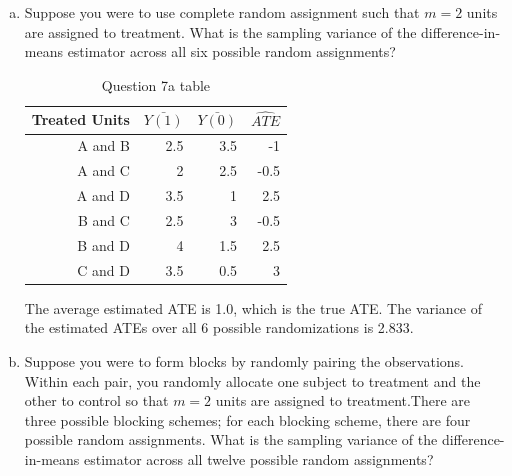 \documentclass[11pt,notitlepage]{article}\usepackage[]{graphicx}\usepackage[]{color}
\begin{document}
\begin{enumerate}[a)]
\item Suppose you were to use complete random assignment such that $m=2$ units are assigned to treatment.  What is the sampling variance of the difference-in-means estimator across all six possible random assignments?

\begin{table}[htbp]
  \centering
  \caption{Question 7a table}
    \begin{tabular}{rrrr}
    \toprule
     Treated Units     &  $\bar{Y(1)}$ &  $\bar{Y(0)}$ &  $\widehat{ATE}$ \\
    \midrule
    A and B & 2.5   & 3.5   & -1 \\
    A and C & 2     & 2.5   & -0.5 \\
    A and D & 3.5   & 1     & 2.5 \\
    B and C & 2.5   & 3     & -0.5 \\
    B and D & 4     & 1.5   & 2.5 \\
    C and D & 3.5     & 0.5   & 3 \\
    \bottomrule
    \end{tabular}%
  \label{tab:addlabel}%
\end{table}%

The average estimated ATE is 1.0, which is the true ATE. The variance of the estimated ATEs over all 6 possible randomizations is 2.833.

\item Suppose you were to form blocks by randomly pairing the observations. Within each pair, you randomly allocate one subject to treatment and the other to control so that $m=2$ units are assigned to treatment.There are three possible blocking schemes; for each blocking scheme, there are four possible random assignments.  What is the sampling variance of the difference-in-means estimator across all twelve possible random assignments?


\end{enumerate}
\end{document}
